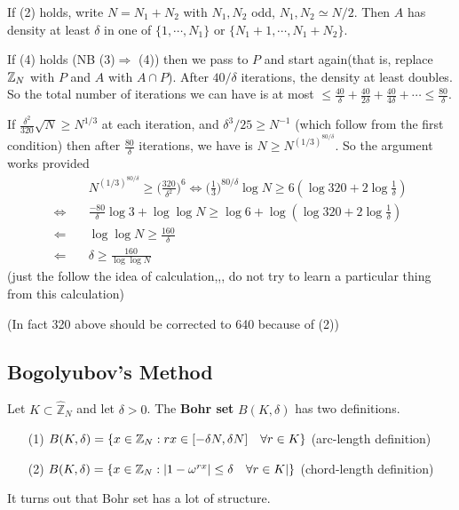 \documentclass[10pt,a4paper]{report}
\renewcommand{\hat}{\widehat}
\begin{document}
\quad If (2) holds, write $N=N_1+N_2$ with $N_1, N_2$ odd, $N_1, N_2 \simeq N/2$. Then $A$ has density at least $\delta$ in one of $\{1,\cdots, N_1\}$ or $\{N_1 +1, \cdots, N_1 + N_2\}$.

\quad If (4) holds (NB (3)$\Rightarrow$ (4)) then we pass to $P$ and start again(that is, replace $\mathbb{Z}_N$ with $P$ and $A$ with $A\cap P$). After $40/\delta$ iterations, the density at least doubles. So the total number of iterations we can have is at most $\leq \frac{40}{\delta} + \frac{40}{2\delta} + \frac{40}{4\delta} + \cdots \leq \frac{80}{\delta}$.

\quad If $\frac{\delta^2}{320} \sqrt{N} \geq N^{1/3}$ at each iteration, and $\delta^3/25 \geq N^{-1}$ (which follow from the first condition) then after $\frac{80}{\delta}$ iterations, we have is $N\geq N^{(1/3)^{80/\delta}}$. So the argument works provided
\begin{align*}
&N^{(1/3)^{80/\delta}} \geq \Big( \frac{320}{\delta^2} \Big)^6 \Leftrightarrow \Big( \frac{1}{3} \Big)^{80/\delta} \log N \geq 6(\log 320 + 2\log \frac{1}{\delta}) \\
\Leftrightarrow \quad & \frac{-80}{\delta} \log 3 + \log \log N \geq \log 6 + \log (\log 320 + 2\log \frac{1}{\delta}) \\
\Leftarrow \quad &\log \log N \geq \frac{160}{\delta} \\
\Leftarrow \quad &\delta\geq \frac{160}{\log \log N}
\end{align*}
(just the follow the idea of calculation,,, do not try to learn a particular thing from this calculation)

(In fact 320 above should be corrected to 640 because of (2))
\s

\subsection*{Bogolyubov's Method}

 Let $K \subset \hat{\mathbb{Z}}_N$ and let $\delta >0$. The \textbf{Bohr set} $B(K,\delta)$ has two definitions.
\begin{itemize}
\item[(1)] $B(K,\delta) = \{x\in \mathbb{Z}_N : rx \in [-\delta N, \delta N] \quad \forall r\in K \}$ (arc-length definition)
\item[(2)] $B(K,\delta) = \{x\in \mathbb{Z}_N : |1- \omega^{rx}| \leq \delta \quad \forall r\in K|\}$ (chord-length definition)
\end{itemize}
\s

It turns out that Bohr set has a lot of structure.
\s
\end{document}
